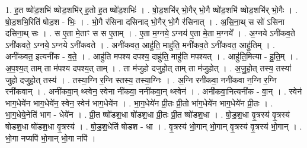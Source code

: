 \documentclass[17pt]{extarticle}
\begin{document}
1. ह॒त ष्षो॑ड॒शभि॑ ष्षोड॒शभि॑र् ह॒तो ह॒त ष्षो॑ड॒शभिः॑ । . षो॒ड॒शभि॑र् भो॒गैर् भो॒गै ष्षो॑ड॒शभि॑ ष्षोड॒शभि॑र् भो॒गैः । . षो॒ड॒शभि॒रिति॑ षोड॒श - भिः॒ । . भो॒गै र॑सिना दसिनाद् भो॒गैर् भो॒गै र॑सिनात् । . अ॒सि॒ना॒थ् स सो॑ ऽसिना दसिना॒थ् सः । . स ए॒ता मे॒ताꣳ स स ए॒ताम् । . ए॒ता म॒ग्नये॒ ऽग्नय॑ ए॒ता मे॒ता म॒ग्नये᳚ । . अ॒ग्नये ऽनी॑कव॒ते ऽनी॑कवते॒ ऽग्नये॒ ऽग्नये ऽनी॑कवते । . अनी॑कवत॒ आहु॑ति॒ माहु॑ति॒ मनी॑कव॒ते ऽनी॑कवत॒ आहु॑तिम् । . अनी॑कवत॒ इत्यनी॑क - व॒ते॒ । . आहु॑ति मपश्य दपश्य॒ दाहु॑ति॒ माहु॑ति मपश्यत् । . आहु॑ति॒मित्या - हु॒ति॒म् । . अ॒प॒श्य॒त् ताम् ता म॑पश्य दपश्य॒त् ताम् । . ता म॑जुहो दजुहो॒त् ताम् ता म॑जुहोत् । . अ॒जु॒हो॒त् तस्य॒ तस्या॑ जुहो दजुहो॒त् तस्य॑ । . तस्या॒ग्नि र॒ग्नि स्तस्य॒ तस्या॒ग्निः । . अ॒ग्नि रनी॑कवा॒ ननी॑कवा न॒ग्नि र॒ग्नि रनी॑कवान् । . अनी॑कवा॒न् थ्स्वेन॒ स्वेना नी॑कवा॒ ननी॑कवा॒न् थ्स्वेन॑ । . अनी॑कवा॒नित्यनी॑क - वा॒न् । . स्वेन॑ भाग॒धेये॑न भाग॒धेये॑न॒ स्वेन॒ स्वेन॑ भाग॒धेये॑न । . भा॒ग॒धेये॑न प्री॒तः प्री॒तो भा॑ग॒धेये॑न भाग॒धेये॑न प्री॒तः । . भा॒ग॒धेये॒नेति॑ भाग - धेये॑न । . प्री॒त ष्षो॑डश॒धा षो॑डश॒धा प्री॒तः प्री॒त ष्षो॑डश॒धा । . षो॒ड॒श॒धा वृ॒त्रस्य॑ वृ॒त्रस्य॑ षोडश॒धा षो॑डश॒धा वृ॒त्रस्य॑ । . षो॒ड॒श॒धेति॑ षोडश - धा । . वृ॒त्रस्य॑ भो॒गान् भो॒गान् वृ॒त्रस्य॑ वृ॒त्रस्य॑ भो॒गान् । . भो॒गा नप्यपि॑ भो॒गान् भो॒गा नपि॑ । \newline
\end{document}
